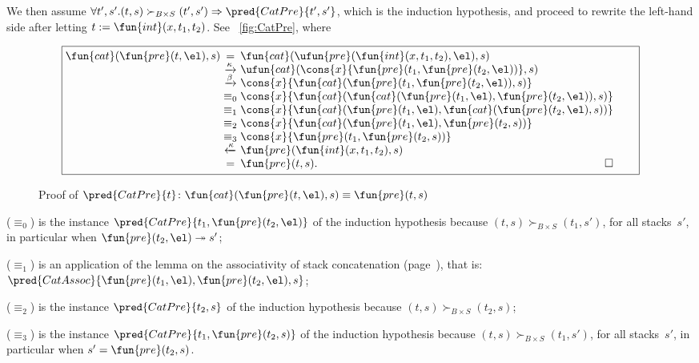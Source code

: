 We then assume \(\forall t',s'.(t,s) \succ_{B \times S} (t',s')
\Rightarrow \pred{CatPre}{t',s'}\), which is the induction hypothesis,
and proceed to rewrite the left\hyp{}hand side after letting \(t :=
\fun{int}(x,t_1,t_2)\). See \fig~\vref{fig:CatPre}, where
\begin{figure}[t]
\begin{equation*}
\boxed{%
\begin{array}{@{}r@{\;}c@{\;}l@{\qquad}}
  \fun{cat}(\fun{pre}(t,\el),s)
& =
& \fun{cat}(\ufun{pre}(\fun{int}(x,t_1,t_2),\el),s)\\
& \xrightarrow{\smash{\kappa}}
& \ufun{cat}(\cons{x}{\fun{pre}(t_1,\fun{pre}(t_2,\el))},s)\\
& \xrightarrow{\smash{\beta}}
& \cons{x}{\fun{cat}(\fun{pre}(t_1,\fun{pre}(t_2,\el)),s)}\\
& \equiv_0
& \cons{x}{\fun{cat}(\fun{cat}(\fun{pre}(t_1,\el),\fun{pre}(t_2,\el)),s)}\\
& \equiv_1
& \cons{x}{\fun{cat}(\fun{pre}(t_1,\el),\fun{cat}(\fun{pre}(t_2,\el),s))}\\
& \equiv_2
& \cons{x}{\fun{cat}(\fun{pre}(t_1,\el),\fun{pre}(t_2,s))}\\
& \equiv_3
& \cons{x}{\fun{pre}(t_1,\fun{pre}(t_2,s))}\\
& \xleftarrow{\smash{\kappa}}
& \fun{pre}(\fun{int}(x,t_1,t_2),s)\\
& =
& \fun{pre}(t,s). \hfill\Box
\end{array}}
\end{equation*}
\caption{Proof of \(\pred{CatPre}{t} \colon
  \fun{cat}(\fun{pre}(t,\el),s) \equiv
  \fun{pre}(t,s)\)}
\label{fig:CatPre}
\end{figure}
\begin{itemize*}

  \item (\(\equiv_0\)) is the instance
  \(\pred{CatPre}{t_1,\fun{pre}(t_2,\el)}\) of the induction
  hypothesis because \((t,s) \succ_{B \times S} (t_1,s')\), for all
  stacks~\(s'\), in particular when \(\fun{pre}(t_2,\el)
  \twoheadrightarrow s'\);

  \item (\(\equiv_1\)) is an application of the lemma on the
  associativity of stack concatenation
  (page~\pageref{proof:assoc_cat}), that is:
  \(\pred{CatAssoc}{\fun{pre}(t_1,\el),\fun{pre}(t_2,\el),s}\);

  \item (\(\equiv_2\)) is the instance
  \(\pred{CatPre}{t_2,s}\) of the
  induction hypothesis because \((t,s) \succ_{B \times S} (t_2,s)\);

  \item (\(\equiv_3\)) is the instance \(\pred{CatPre}{t_1,
    \fun{pre}(t_2,s)}\) of the induction hypothesis because \((t,s)
    \succ_{B \times S} (t_1,s')\), for all stacks~\(s'\), in
    particular when \(s' = \fun{pre}(t_2,s)\).
\end{itemize*}
